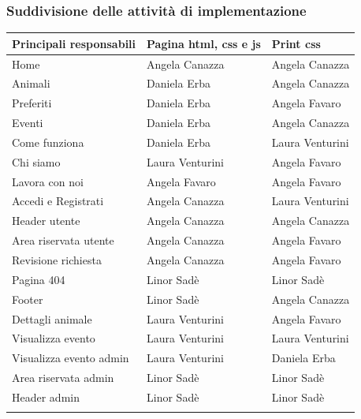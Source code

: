 \subsubsection{Suddivisione delle attività di implementazione}
\begin{center}
\begin{tabular}{|l|l|l|}
\hline
\rowcolor{brown}
\color{white}\textbf{Principali responsabili} &
\color{white}\textbf{Pagina html, css e js} &
\color{white}\textbf{Print css} \\
\hline
\rowcolor{beige}
Home & Angela Canazza  & Angela Canazza  \\
\hline
\rowcolor{beige}
Animali & Daniela Erba & Angela Canazza \\
\hline
\rowcolor{beige}
Preferiti & Daniela Erba & Angela Favaro \\
\hline
\rowcolor{beige}
Eventi & Daniela Erba & Angela Canazza \\
\hline
\rowcolor{beige}
Come funziona & Daniela Erba &  Laura Venturini \\
\hline
\rowcolor{beige}
Chi siamo & Laura Venturini & Angela Favaro \\
\hline
\rowcolor{beige}
Lavora con noi & Angela Favaro & Angela Favaro \\
\hline
\rowcolor{beige}
Accedi e Registrati & Angela Canazza & Laura Venturini \\
\hline
\rowcolor{beige}
Header utente & Angela Canazza & Angela Canazza \\
\hline
\rowcolor{beige}
Area riservata utente & Angela Canazza & Angela Favaro  \\
\hline
\rowcolor{beige}
Revisione richiesta & Angela Canazza & Angela Favaro \\
\hline
\rowcolor{beige}
Pagina 404 & Linor Sadè & Linor Sadè \\
\hline
\rowcolor{beige}
Footer & Linor Sadè & Angela Canazza \\
\hline
\rowcolor{beige}
Dettagli animale & Laura Venturini &  Angela Favaro\\
\hline
\rowcolor{beige}
Visualizza evento & Laura Venturini &  Laura Venturini\\
\hline
\rowcolor{beige}
Visualizza evento admin & Laura Venturini &  Daniela Erba\\
\hline
\rowcolor{beige}
Area riservata admin & Linor Sadè & Linor Sadè \\
\hline
\rowcolor{beige}
Header admin & Linor Sadè & Linor Sadè \\
\hline
\rowcolor{beige}

\end{tabular}
\end{center}
